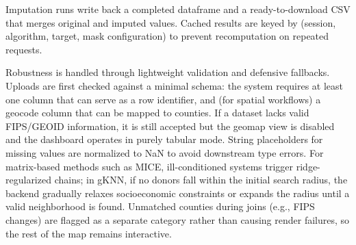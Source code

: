 \documentclass{egpubl}
\newcommand{\gknn}{gKNN\xspace}
\newcommand{\mice}{MICE\xspace}
\begin{document}
Imputation runs write back a completed dataframe and a ready-to-download CSV that merges original and imputed values. Cached results are keyed by (session, algorithm, target, mask configuration) to prevent recomputation on repeated requests.

Robustness is handled through lightweight validation and defensive fallbacks. Uploads are first checked against a minimal schema: the system requires at least one column that can serve as a row identifier, and (for spatial workflows) a geocode column that can be mapped to counties. If a dataset lacks valid FIPS/GEOID information, it is still accepted but the geomap view is disabled and the dashboard operates in purely tabular mode. String placeholders for missing values are normalized to NaN to avoid downstream type errors. For matrix-based methods such as \mice, ill-conditioned systems trigger ridge-regularized chains; in \gknn, if no donors fall within the initial search radius, the backend gradually relaxes socioeconomic constraints or expands the radius until a valid neighborhood is found. Unmatched counties during joins (e.g., FIPS changes) are flagged as a separate category rather than causing render failures, so the rest of the map remains interactive.



\end{document}

